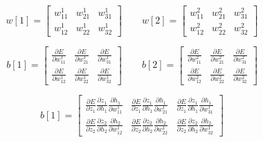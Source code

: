 \begin{equation*}
    w[1] = \begin{bmatrix}
           w_{11}^1 & w_{21}^1 & w_{31}^1 \\[0.25cm]
           w_{12}^1 & w_{22}^1 & w_{32}^1
           \end{bmatrix}
    \qquad
    w[2] = \begin{bmatrix}
           w_{11}^2 & w_{21}^2 & w_{31}^2 \\[0.25cm]
           w_{12}^2 & w_{22}^2 & w_{32}^2
           \end{bmatrix}
\end{equation*}

\begin{equation*}
    b[1] = \begin{bmatrix}
           \frac{\partial E}{\partial w_{11}^1} & \frac{\partial E}{\partial w_{21}^1} & \frac{\partial E}{\partial w_{31}^1} \\[0.5cm]
           \frac{\partial E}{\partial w_{12}^1} & \frac{\partial E}{\partial w_{22}^1} & \frac{\partial E}{\partial w_{32}^1}
           \end{bmatrix}
    \qquad
    b[2] = \begin{bmatrix}
           \frac{\partial E}{\partial w_{11}^2} & \frac{\partial E}{\partial w_{21}^2} & \frac{\partial E}{\partial w_{31}^2} \\[0.5cm]
           \frac{\partial E}{\partial w_{12}^2} & \frac{\partial E}{\partial w_{22}^2} & \frac{\partial E}{\partial w_{32}^2}
           \end{bmatrix}
\end{equation*}

\begin{equation*}
    b[1] = \begin{bmatrix}
       \frac{\partial E}{\partial z_1} \frac{\partial z_1}{\partial h_1} \frac{\partial h_1}{\partial w_{11}^1} &
       \frac{\partial E}{\partial z_1} \frac{\partial z_1}{\partial h_1} \frac{\partial h_1}{\partial w_{21}^1} &
       \frac{\partial E}{\partial z_1} \frac{\partial z_1}{\partial h_1} \frac{\partial h_1}{\partial w_{31}^1}
       \\[0.5cm]

       \frac{\partial E}{\partial z_2} \frac{\partial z_2}{\partial h_2} \frac{\partial h_2}{\partial w_{12}^1} &
       \frac{\partial E}{\partial z_2} \frac{\partial z_2}{\partial h_2} \frac{\partial h_2}{\partial w_{22}^1} &
       \frac{\partial E}{\partial z_2} \frac{\partial z_2}{\partial h_2} \frac{\partial h_2}{\partial w_{32}^1}
           \end{bmatrix}
\end{equation*}

